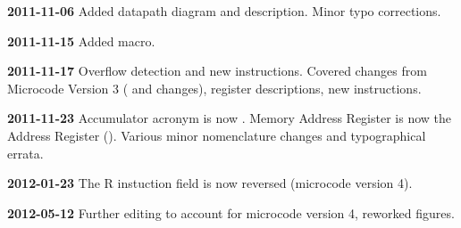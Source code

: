   {\bfseries 2011-11-06} Added datapath diagram and description. Minor typo
  corrections.

  {\bfseries 2011-11-15} Added  macro.

  {\bfseries 2011-11-17} Overflow detection and new instructions. Covered
  changes from Microcode Version 3 ( and  changes),
  register descriptions, new instructions.

  {\bfseries 2011-11-23} Accumulator acronym is now \A. Memory Address
  Register is now the Address Register (\AR). Various minor
  nomenclature changes and typographical errata.

  {\bfseries 2012-01-23} The {\sffamily R} instuction field is now reversed
  (microcode version 4).

  {\bfseries 2012-05-12} Further editing to account for microcode version 4,
  reworked figures.









